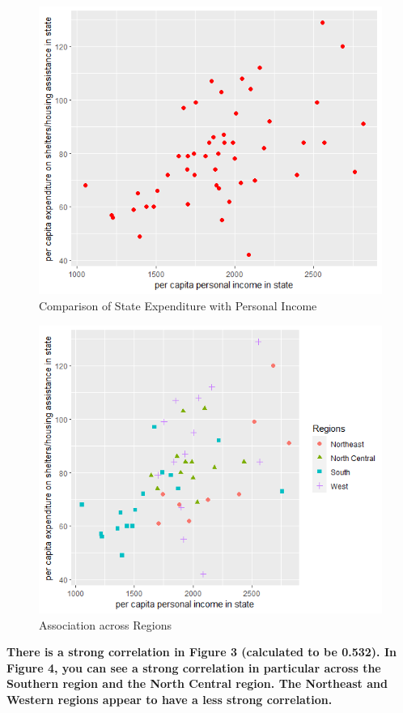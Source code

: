 \documentclass[12pt,letterpaper]{article}
\begin{document}
\begin{figure}[H] %
	
	\centering
	\includegraphics[scale=0.5]{Rplot07_red.png}
	\caption{Comparison of State Expenditure with Personal Income}
	\label{fig:scatterplot}
	\newpage
\end{figure} 


\begin{figure}[H] %
	
	\centering
	\includegraphics[scale=0.5]{Rplot_with_regions.png}
	\caption{Association across Regions}
	\label{fig:scatterplot}
	\newpage
\end{figure} 

\noindent  \textbf {There is a strong correlation in Figure 3 (calculated to be 0.532). In Figure 4, you can see a strong correlation in particular across the Southern region and the North Central region. The Northeast and Western regions appear to have a less strong correlation.}
\end{document}
